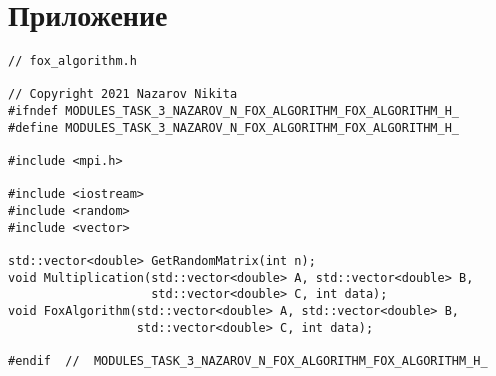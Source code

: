 \documentclass{report}
\begin{document}
\section*{Приложение}
\begin{lstlisting}
// fox_algorithm.h

// Copyright 2021 Nazarov Nikita
#ifndef MODULES_TASK_3_NAZAROV_N_FOX_ALGORITHM_FOX_ALGORITHM_H_
#define MODULES_TASK_3_NAZAROV_N_FOX_ALGORITHM_FOX_ALGORITHM_H_

#include <mpi.h>

#include <iostream>
#include <random>
#include <vector>

std::vector<double> GetRandomMatrix(int n);
void Multiplication(std::vector<double> A, std::vector<double> B,
                    std::vector<double> C, int data);
void FoxAlgorithm(std::vector<double> A, std::vector<double> B,
                  std::vector<double> C, int data);

#endif  //  MODULES_TASK_3_NAZAROV_N_FOX_ALGORITHM_FOX_ALGORITHM_H_

\end{lstlisting}
\newpage
\end{document}
